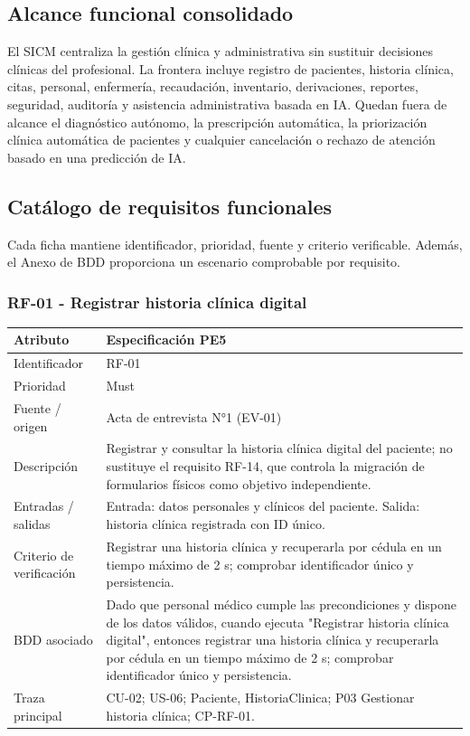 \documentclass[11pt,a4paper]{article}
\begin{document}
	\subsection{Alcance funcional consolidado}
	El SICM centraliza la gestión clínica y administrativa sin sustituir decisiones clínicas del profesional. La frontera incluye registro de pacientes, historia clínica, citas, personal, enfermería, recaudación, inventario, derivaciones, reportes, seguridad, auditoría y asistencia administrativa basada en IA. Quedan fuera de alcance el diagnóstico autónomo, la prescripción automática, la priorización clínica automática de pacientes y cualquier cancelación o rechazo de atención basado en una predicción de IA.
\subsection{Catálogo de requisitos funcionales}
	Cada ficha mantiene identificador, prioridad, fuente y criterio verificable. Además, el Anexo de BDD proporciona un escenario comprobable por requisito.
	\subsubsection{RF-01 - Registrar historia clínica digital}
	\begin{tabularx}{\textwidth}{p{3.2cm}Y}
		\toprule
		\textbf{Atributo} & \textbf{Especificación PE5}\\\midrule
		Identificador & RF-01\\
		Prioridad & Must\\
		Fuente / origen & Acta de entrevista N°1 (EV-01)\\
		Descripción & Registrar y consultar la historia clínica digital del paciente; no sustituye el requisito RF-14, que controla la migración de formularios físicos como objetivo independiente.\\
		Entradas / salidas & Entrada: datos personales y clínicos del paciente. Salida: historia clínica registrada con ID único.\\
		Criterio de verificación & Registrar una historia clínica y recuperarla por cédula en un tiempo máximo de 2 s; comprobar identificador único y persistencia.\\
		BDD asociado & Dado que personal médico cumple las precondiciones y dispone de los datos válidos, cuando ejecuta "Registrar historia clínica digital", entonces registrar una historia clínica y recuperarla por cédula en un tiempo máximo de 2 s; comprobar identificador único y persistencia.\\
		Traza principal & CU-02; US-06; Paciente, HistoriaClinica; P03 Gestionar historia clínica; CP-RF-01.\\
		\bottomrule
	\end{tabularx}
\end{document}

